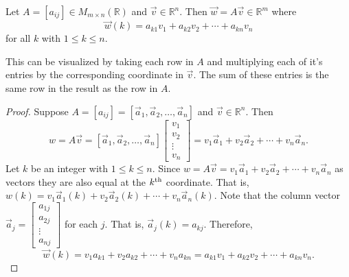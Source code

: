 \begin{proposition}\label{prop:vec_row-column}
Let $A=[a_{ij}]\in M_{m\times n}(\mathbb{R})$ and $\vec{v} \in \mathbb{R}^n$. 
Then $\vec{w}=A\vec{v} \in \mathbb{R}^m$ where  
\[\vec{w}(k)=a_{k1}v_1+a_{k2}v_2+\cdots+a_{kn}v_n\] 
for all $k$ with $1 \le k \le n$.
\end{proposition}
\begin{remark} 
This can be visualized by taking each row in $A$ and multiplying 
each of it's entries by the corresponding coordinate in $\vec{v}$. The sum of 
these entries is the same row in the result as the row in $A$.\\

\end{remark}
\begin{proof}
Suppose $A=[a_{ij}]=[\vec{a}_1,\vec{a}_2,\ldots,\vec{a}_n]$ and  
$\vec{v} \in \mathbb{R}^n$. Then 
\[
w=A\vec{v}=[\vec{a}_1,\vec{a}_2,\ldots,\vec{a}_n] \begin{bmatrix}v_1\\ 
v_2 \\ 
\vdots \\ 
v_n\end{bmatrix}=v_1\vec{a}_1+v_2\vec{a}_2+\cdots+v_n\vec{a}_n.
\]
Let $k$ be an integer with $1 \le k \le n$. Since 
$w=A\vec{v}=v_1\vec{a}_1+v_2\vec{a}_2+\cdots+v_n\vec{a}_n$ as vectors they are 
also equal at the $k^{\tiny\text{th}}$ coordinate. That is, 
$w(k)=v_1\vec{a}_1(k)+v_2\vec{a}_2(k)+\cdots+v_n\vec{a}_n(k)$. 
Note that the column vector 
$\vec{a}_j=\begin{bmatrix}a_{1j}\\ a_{2j}\\ \vdots \\ a_{nj}\end{bmatrix}$ for 
each $j$. That is, $\vec{a}_j(k)=a_{kj}$. Therefore, 
\[\vec{w}(k)=v_1a_{k1}+v_2a_{k2}+\cdots+v_na_{kn}=a_{k1}v_1+a_{k2}v_2+\cdots+a_{
kn}v_n.\]
\end{proof}

